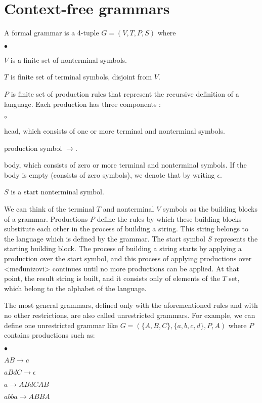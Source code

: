 \section{Context-free grammars}
A formal grammar is a 4-tuple $G = (V, T, P, S)$ \citep{sipser2013introduction} where
\begin{list}{$\bullet$}{}  	
	\item $V$ is a finite set of nonterminal symbols.
	\item $T$ is finite set of terminal symbols, disjoint from $V$.
	\item $P$ is finite set of production rules that represent the recursive definition of a language. Each production has three components \citep{hopcroft2007automatatheory}:
		\begin{list}{$\circ$}{}
			\item head, which consists of one or more terminal and nonterminal symbols.
			\item production symbol $\rightarrow$.
			\item body, which consists of zero or more terminal and nonterminal symbols. If the body is empty (consists of zero symbols), we denote that by writing $\epsilon$.
		\end{list}
	\item $S$ is a start nonterminal symbol.
\end{list}

We can think of the terminal $T$ and nonterminal $V$ symbols as the building blocks of a grammar. Productions $P$ define the rules by which these building blocks substitute each other in the process of building a string. This string belongs to the language which is defined by the grammar. The start symbol $S$ represents the starting building block. The process of building a string starts by applying a production over the start symbol, and this process of applying productions over <međunizovi> continues until no more productions can be applied. At that point, the result string is built, and it consists only of elements of the $T$ set, which belong to the alphabet of the language.

The most general grammars, defined only with the aforementioned rules and with no other restrictions, are also called unrestricted grammars. For example, we can define one unrestricted grammar like $G = (\{A, B, C\}, \{a, b, c, d\}, P, A)$ where $P$ contains productions such as:
\begin{list}{$\bullet$}{}  	
	\item $AB \rightarrow c$
	\item $aBdC \rightarrow \epsilon$
	\item $a \rightarrow ABdCAB$
	\item $abba \rightarrow ABBA$
\end{list}

